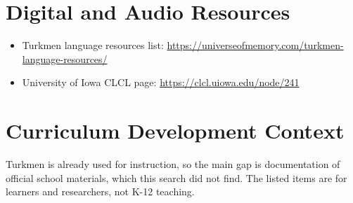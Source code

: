 \documentclass[12pt]{article}
\begin{document}
\section{Digital and Audio Resources}
\begin{itemize}
\item Turkmen language resources list: \url{https://universeofmemory.com/turkmen-language-resources/}
\item University of Iowa CLCL page: \url{https://clcl.uiowa.edu/node/241}
\end{itemize}
\section{Curriculum Development Context}
Turkmen is already used for instruction, so the main gap is documentation of official school materials, which this search did not find. The listed items are for learners and researchers, not K-12 teaching.
\end{document}

